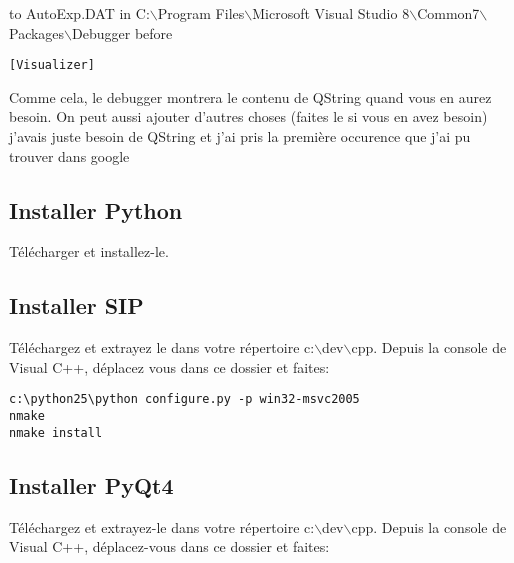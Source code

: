to AutoExp.DAT in C:$\backslash$Program Files$\backslash$Microsoft Visual Studio
8$\backslash$Common7$\backslash$Packages$\backslash$Debugger before 

\begin{verbatim}
[Visualizer]
\end{verbatim}

Comme cela, le debugger montrera le contenu de QString quand vous en aurez besoin. On peut aussi ajouter d'autres choses (faites le si vous en avez besoin) j'avais juste besoin de QString et j'ai pris la première occurence que j'ai pu trouver dans google


\subsection{Installer Python}
Télécharger  et installez-le.

\subsection{Installer SIP}
Téléchargez et extrayez le dans votre répertoire c:$\backslash$dev$\backslash$cpp.
Depuis la console de Visual C++, déplacez vous dans ce dossier et faites:

\begin{verbatim}
c:\python25\python configure.py -p win32-msvc2005
nmake
nmake install
\end{verbatim}

\subsection{Installer PyQt4}
Téléchargez  et extrayez-le dans votre répertoire c:$\backslash$dev$\backslash$cpp.
Depuis la console de Visual C++, déplacez-vous dans ce dossier et faites:


